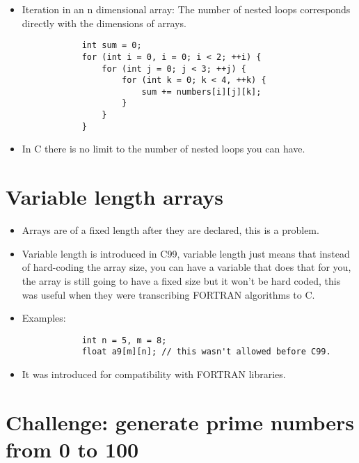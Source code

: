 \begin{itemize}
    \item Iteration in an n dimensional array: The number of nested loops corresponds directly with the dimensions of arrays. 
        \begin{verbatim}
            int sum = 0;
            for (int i = 0, i = 0; i < 2; ++i) {
                for (int j = 0; j < 3; ++j) {
                    for (int k = 0; k < 4, ++k) {
                        sum += numbers[i][j][k];
                    }
                }
            }
        \end{verbatim}
    
    \item In C there is no limit to the number of nested loops you can have. 
\end{itemize}


\section{Variable length arrays}
\begin{itemize}
    \item Arrays are of a fixed length after they are declared, this is a problem. 
    \item Variable length is introduced in C99, variable length just means that instead of hard-coding the array size, you can have a variable that does that for you, the array is still going to have a fixed size but it won't be hard coded, this was useful when they were transcribing FORTRAN algorithms to C. 
    \item Examples:  
        \begin{verbatim}
            int n = 5, m = 8; 
            float a9[m][n]; // this wasn't allowed before C99. 
        \end{verbatim}
    
    \item It was introduced for compatibility with FORTRAN libraries. 
\end{itemize}


\section{Challenge: generate prime numbers from 0 to 100}



